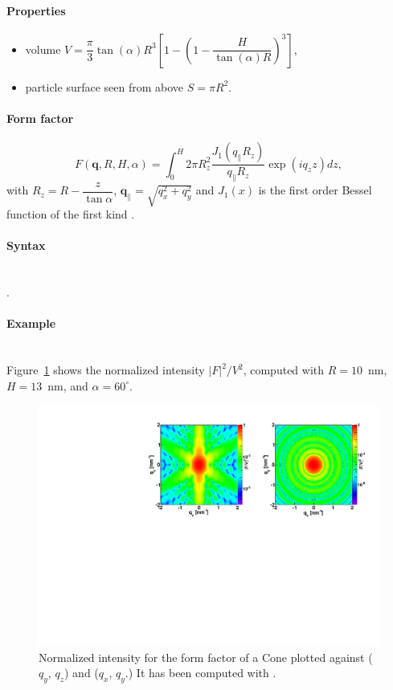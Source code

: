 \paragraph{Properties}
\begin{itemize}
\item volume $V = \dfrac{\pi}{3} \tan(\alpha) R^3 \left[ 
            1 - \left(1- \dfrac{H}{\tan(\alpha)R}\right)^3\right]$,
\item  particle surface seen from above $S=\pi R^2$.
\end{itemize}

\paragraph{Form factor}
\begin{equation*}
F(\mathbf{q}, R, H, \alpha) = \int_0 ^H 2\pi R_z^2
\frac{J_1(q_{\parallel}R_z)}{q_{\parallel} R_z}\exp(iq_z z)dz,
\end{equation*}
with $R_z =R-\dfrac{z}{\tan \alpha}$, $\mathbf{q}_{\parallel}=\sqrt{q_x^2+ q_y^2}$ and $J_1(x)$ is the first order
Bessel function of the first kind \cite{AbSt64}.

\paragraph{Syntax}\strut\\
. 

\paragraph{Example}\strut\\
Figure~\ref{fig:FFConeEx} shows the normalized intensity
$|F|^2/V^2$, computed with $R=10$~nm, $H=13$~nm, and $\alpha=60^{\circ}$.
\begin{figure}[ht]
\begin{center}
\includegraphics[angle=-90,width=\textwidth]{fig/ff/figffcone.pdf}
\end{center}
\caption{Normalized intensity for the form factor of a Cone plotted against ($q_y$, $q_z$) and ($q_x$, $q_y$.) It
  has been  computed with .}
\label{fig:FFConeEx}
\end{figure}

